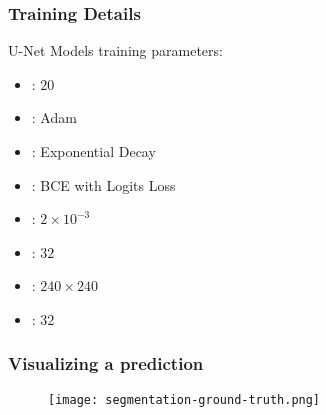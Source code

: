 \documentclass[../presentation.tex]{subfiles} %
\begin{document}
\begin{frame}[t]

	\frametitle{Training Details}

	U-Net Models training parameters:

	\begin{itemize}
		\setlength{\itemsep}{2ex}
		\item {}: $20$
		\item {}: Adam 
		\item {}: Exponential Decay 
		\item {}: BCE with Logits Loss %
		\item {}: $2 \times 10^{-3}$
		\item {}: $32$ 
		\item {}: $240 \times 240$
		\item {}: $32$
	\end{itemize}

\end{frame}


\begin{frame}

	\frametitle{Visualizing a prediction}

	\vspace{-2ex}

		\begin{figure}
			\centering
			\texttt{[image: segmentation-ground-truth.png]}
		\end{figure}

\end{frame}
\end{document}
